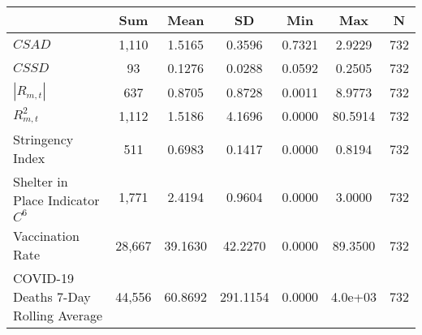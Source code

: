 {
\def\sym#1{\ifmmode^{#1}\else\(^{#1}\)\fi}
\begin{tabular}{l*{1}{cccccc}}
\toprule
                    &         Sum&        Mean&          SD&         Min&         Max&           N\\
\midrule
$CSAD$                &       1,110&      1.5165&      0.3596&      0.7321&      2.9229&         732\\
$CSSD$                &          93&      0.1276&      0.0288&      0.0592&      0.2505&         732\\
$|R_{m,t}|$&         637&      0.8705&      0.8728&      0.0011&      8.9773&         732\\
$R_{m,t}^2$&       1,112&      1.5186&      4.1696&      0.0000&     80.5914&         732\\
Stringency Index   &         511&      0.6983&      0.1417&      0.0000&      0.8194&         732\\
Shelter in Place Indicator $C^6$&       1,771&      2.4194&      0.9604&      0.0000&      3.0000&         732\\
Vaccination Rate    &      28,667&     39.1630&     42.2270&      0.0000&     89.3500&         732\\
COVID-19 Deaths 7-Day Rolling Average&      44,556&     60.8692&    291.1154&      0.0000&     4.0e+03&         732\\
\bottomrule
\end{tabular}
}
